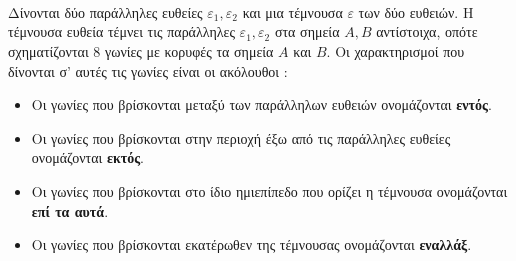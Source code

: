 \documentclass[twoside,nofonts,internet,shmeiwseis]{thewria}
\begin{document}
\orismoi
{}
\mbox{}\\\\\\
Δίνονται δύο παράλληλες ευθείες $ \varepsilon_1,\varepsilon_2 $ και μια τέμνουσα $ \varepsilon $ των δύο ευθειών. Η τέμνουσα ευθεία τέμνει τις παράλληλες $ \varepsilon_1,\varepsilon_2 $ στα σημεία $ A,B $ αντίστοιχα, οπότε σχηματίζονται 8 γωνίες με κορυφές τα σημεία $ A $ και $ B $. Οι χαρακτηρισμοί που δίνονται σ' αυτές τις γωνίες είναι οι ακόλουθοι :
\begin{itemize}[itemsep=0mm]
\item Οι γωνίες που βρίσκονται μεταξύ των παράλληλων ευθειών ονομάζονται \textbf{εντός}.
\item Οι γωνίες που βρίσκονται στην περιοχή έξω από τις παράλληλες ευθείες ονομάζονται \textbf{εκτός}.
\item Οι γωνίες που βρίσκονται στο ίδιο ημιεπίπεδο που ορίζει η τέμνουσα ονομάζονται \textbf{επί τα αυτά}.
\item Οι γωνίες που βρίσκονται εκατέρωθεν της τέμνουσας ονομάζονται \textbf{εναλλάξ}.
\end{itemize}
\end{document}
